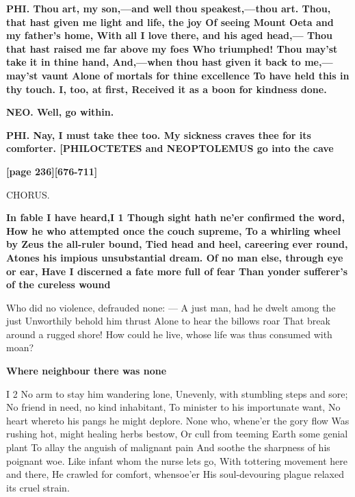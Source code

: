 \documentclass[11pt,letter]{book}
\begin{document}
\par \textbf{PHI. Thou art, my son,—and well thou speakest,—thou art. Thou, that hast given me light and life, the joy Of seeing Mount Oeta and my father’s home, With all I love there, and his aged head,— Thou that hast raised me far above my foes Who triumphed! Thou may’st take it in thine hand, And,—when thou hast given it back to me,—may’st vaunt Alone of mortals for thine excellence To have held this in thy touch. I, too, at first, Received it as a boon for kindness done.}
\par 

\par \textbf{NEO. Well, go within.}
\par 

\par \textbf{PHI. Nay, I must take thee too. My sickness craves thee for its comforter. [PHILOCTETES and NEOPTOLEMUS go into the cave}
\par 

\par \textbf{[page 236][676-711]}
\par 

\par  CHORUS.

\par \textbf{In fable I have heard,I 1 Though sight hath ne’er confirmed the word, How he who attempted once the couch supreme, To a whirling wheel by Zeus the all-ruler bound, Tied head and heel, careering ever round, Atones his impious unsubstantial dream. Of no man else, through eye or ear, Have I discerned a fate more full of fear Than yonder sufferer’s of the cureless wound}
\par   Who did no violence, defrauded none: — A just man, had he dwelt among the just Unworthily behold him thrust Alone to hear the billows roar That break around a rugged shore! How could he live, whose life was thus consumed with moan?

\par \textbf{Where neighbour there was none}
\par  I 2 No arm to stay him wandering lone, Unevenly, with stumbling steps and sore; No friend in need, no kind inhabitant, To minister to his importunate want, No heart whereto his pangs he might deplore. None who, whene’er the gory flow Was rushing hot, might healing herbs bestow, Or cull from teeming Earth some genial plant To allay the anguish of malignant pain And soothe the sharpness of his poignant woe. Like infant whom the nurse lets go, With tottering movement here and there, He crawled for comfort, whensoe’er His soul-devouring plague relaxed its cruel strain.
\end{document}
